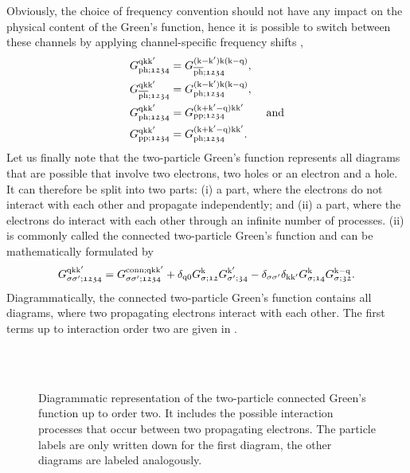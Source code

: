 \documentclass[../../main.tex]{subfiles}
\begin{document}
Obviously, the choice of frequency convention should not have any impact on the physical content of the Green's function, hence it is possible to switch between these channels by applying channel-specific frequency shifts \cite{continuous qmc asympt},
\begin{subequations}
\begin{align}
	G_{\text{ph};\mathfrak{1234}}^{\text{q}\text{k}\text{k}'}&=G_{\overline{\text{ph}};\mathfrak{1234}}^{(\text{k}-\text{k}')\text{k}(\text{k}-\text{q})},\\
	G_{\overline{\text{ph}};\mathfrak{1234}}^{\text{q}\text{k}\text{k}'}&=G_{\text{ph};\mathfrak{1234}}^{(\text{k}-\text{k}')\text{k}(\text{k}-\text{q})},\\
	G_{\text{ph};\mathfrak{1234}}^{\text{q}\text{k}\text{k}'}&=G_{\text{pp};\mathfrak{1234}}^{(\text{k}+\text{k}'-\text{q})\text{k}\text{k}'}\qquad\text{and}\\
	G_{\text{pp};\mathfrak{1234}}^{\text{q}\text{k}\text{k}'}&=G_{\text{ph};\mathfrak{1234}}^{(\text{k}+\text{k}'-\text{q})\text{k}\text{k}'}.
\end{align}
\end{subequations}
Let us finally note that the two-particle Green's function represents all diagrams that are possible that involve two electrons, two holes or an electron and a hole. It can therefore be split into two parts: (i) a part, where the electrons do not interact with each other and propagate independently; and (ii) a part, where the electrons do interact with each other through an infinite number of processes. (ii) is commonly called the connected two-particle Green's function and can be mathematically formulated by
\begin{align}\label{eq:two_particle_green_connected}
	G_{\sigma\sigma';\mathfrak{1234}}^{\text{q}\text{k}\text{k}'}=G_{\sigma\sigma';\mathfrak{1234}}^{\text{conn};\text{q}\text{k}\text{k}'}+\delta_{\text{q}0}G_{\sigma;\mathfrak{12}}^{\text{k}}G_{\sigma';\mathfrak{34}}^{\text{k}'}-\delta_{\sigma\sigma'}\delta_{\text{k}\text{k}'}G_{\sigma;\mathfrak{14}}^{\text{k}}G_{\sigma;\mathfrak{32}}^{\text{k}-\text{q}}.
\end{align}
Diagrammatically, the connected two-particle Green's function contains all diagrams, where two propagating electrons interact with each other. The first terms up to interaction order two are given in .
\begin{figure}[h]
  \centering
  \subfloat{}\vspace{0.5cm}\\
  \subfloat{}\vspace{0.5cm}\\
  \subfloat{}
  \caption{Diagrammatic representation of the two-particle connected Green's function up to order two. It includes the possible interaction processes that occur between two propagating electrons. The particle labels are only written down for the first diagram, the other diagrams are labeled analogously.}
  \label{fig:two_particle_green_connected}
\end{figure}
\end{document}
